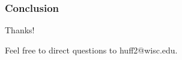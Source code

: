 
\begin{frame}
  \frametitle{Conclusion}
  Thanks!
  
  Feel free to direct questions to huff2@wisc.edu.
\end{frame}

